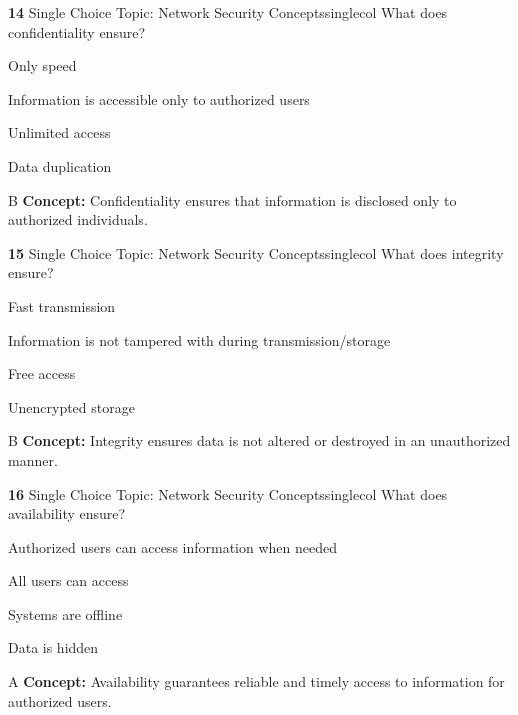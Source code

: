 \documentclass[10pt,a4paper]{article}
\begin{document}
\begin{qcard}{\color{white}\textbf{14} \hfill \small Single Choice \textbar{} Topic: Network Security Concepts}{singlecol}
What does confidentiality ensure?

\begin{qoptions}
\item Only speed
\item Information is accessible only to authorized users
\item Unlimited access
\item Data duplication
\end{qoptions}
\begin{explainbox}{B}
\textbf{Concept:} Confidentiality ensures that information is disclosed only to authorized individuals.
\end{explainbox}
\end{qcard}

\begin{qcard}{\color{white}\textbf{15} \hfill \small Single Choice \textbar{} Topic: Network Security Concepts}{singlecol}
What does integrity ensure?

\begin{qoptions}
\item Fast transmission
\item Information is not tampered with during transmission/storage
\item Free access
\item Unencrypted storage
\end{qoptions}
\begin{explainbox}{B}
\textbf{Concept:} Integrity ensures data is not altered or destroyed in an unauthorized manner.
\end{explainbox}
\end{qcard}

\begin{qcard}{\color{white}\textbf{16} \hfill \small Single Choice \textbar{} Topic: Network Security Concepts}{singlecol}
What does availability ensure?

\begin{qoptions}
\item Authorized users can access information when needed
\item All users can access
\item Systems are offline
\item Data is hidden
\end{qoptions}
\begin{explainbox}{A}
\textbf{Concept:} Availability guarantees reliable and timely access to information for authorized users.
\end{explainbox}
\end{qcard}
\end{document}
